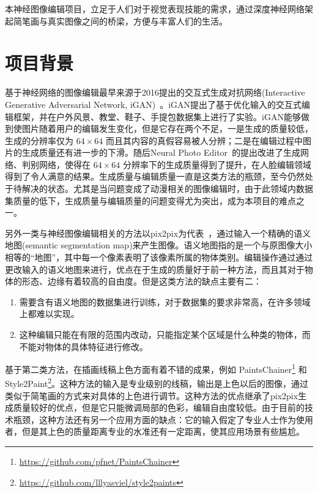 \documentclass[a4paper,12pt,UTF8]{ctexart}
\begin{document}
本神经图像编辑项目，立足于人们对于视觉表现技能的需求，通过深度神经网络架起简笔画与真实图像之间的桥梁，方便与丰富人们的生活。

\section{项目背景}

基于神经网络的图像编辑最早来源于2016提出的交互式生成对抗网络(Interactive Generative Adversarial Network, iGAN)~\cite{Zhu2016Generative}。iGAN提出了基于优化输入的交互式编辑框架，并在户外风景、教堂、鞋子、手提包数据集上进行了实验。iGAN能够做到使图片随着用户的编辑发生变化，但是它存在两个不足，一是生成的质量较低，生成的分辨率仅为 $64 \times 64$ 而且其内容的真假容易被人分辨；二是在编辑过程中图片的生成质量还有进一步的下滑。随后Neural Photo Editor~\cite{Brock2016Neural}的提出改进了生成网络、判别网络，使得在 $64 \times 64$ 分辨率下的生成质量得到了提升，在人脸编辑领域得到了令人满意的结果。生成质量与编辑质量一直是这类方法的瓶颈，至今仍然处于待解决的状态。尤其是当问题变成了动漫相关的图像编辑时，由于此领域内数据集质量的低下，生成质量与编辑质量的问题变得尤为突出，成为本项目的难点之一。

另外一类与神经图像编辑相关的方法以pix2pix为代表~\cite{isola2016image}，通过输入一个精确的语义地图(semantic segmentation map)来产生图像。语义地图指的是一个与原图像大小相等的“地图”，其中每一个像素表明了该像素所属的物体类别。编辑操作通过通过更改输入的语义地图来进行，优点在于生成的质量好于前一种方法，而且其对于物体的形态、边缘有着较高的自由度。但是这类方法的缺点主要有二：

\begin{enumerate}
  \item 需要含有语义地图的数据集进行训练，对于数据集的要求非常高，在许多领域上都难以实现。
  \item 这种编辑只能在有限的范围内改动，只能指定某个区域是什么种类的物体，而不能对物体的具体特征进行修改。
\end{enumerate}

基于第二类方法，在插画线稿上色方面有着不错的成果，例如 PaintsChainer\footnote{\url{https://github.com/pfnet/PaintsChainer}} 和 Style2Paint\footnote{\url{https://github.com/lllyasviel/style2paints}}。这种方法的输入是专业级别的线稿，输出是上色以后的图像，通过类似于简笔画的方式来对具体的上色进行调节。这种方法的优点继承了pix2pix生成质量较好的优点，但是它只能微调局部的色彩，编辑自由度较低。由于目前的技术瓶颈，这种方法还有另一个应用方面的缺点：它的输入假定了专业人士作为使用者，但是其上色的质量距离专业的水准还有一定距离，使其应用场景有些尴尬。
\end{document}
